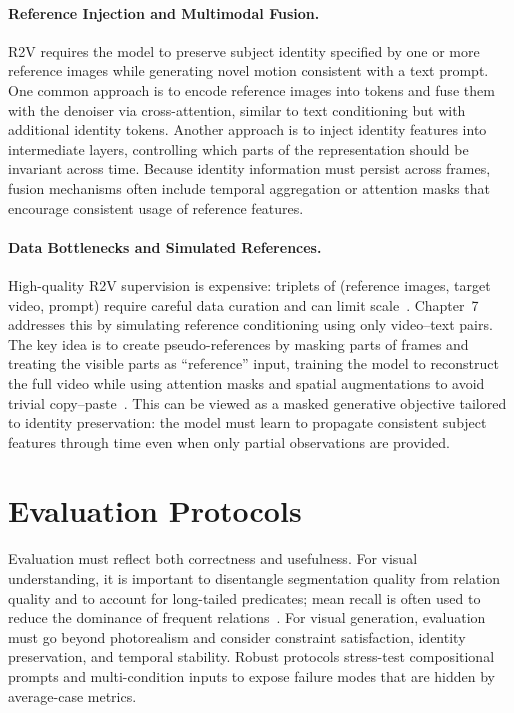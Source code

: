 \paragraph{Reference Injection and Multimodal Fusion.}
R2V requires the model to preserve subject identity specified by one or more reference images while generating novel motion consistent with a text prompt. One common approach is to encode reference images into tokens and fuse them with the denoiser via cross-attention, similar to text conditioning but with additional identity tokens. Another approach is to inject identity features into intermediate layers, controlling which parts of the representation should be invariant across time. Because identity information must persist across frames, fusion mechanisms often include temporal aggregation or attention masks that encourage consistent usage of reference features.

\paragraph{Data Bottlenecks and Simulated References.}
High-quality R2V supervision is expensive: triplets of (reference images, target video, prompt) require careful data curation and can limit scale~\citep{yuan2025opens2v, liu2025phantom}. Chapter~7 addresses this by simulating reference conditioning using only video--text pairs. The key idea is to create pseudo-references by masking parts of frames and treating the visible parts as ``reference'' input, training the model to reconstruct the full video while using attention masks and spatial augmentations to avoid trivial copy--paste~\citep{zhou2025scaling}. This can be viewed as a masked generative objective tailored to identity preservation: the model must learn to propagate consistent subject features through time even when only partial observations are provided.

\section{Evaluation Protocols}
Evaluation must reflect both correctness and usefulness. For visual understanding, it is important to disentangle segmentation quality from relation quality and to account for long-tailed predicates; mean recall is often used to reduce the dominance of frequent relations~\citep{zellers2018neural, yang2022panoptic}. For visual generation, evaluation must go beyond photorealism and consider constraint satisfaction, identity preservation, and temporal stability. Robust protocols stress-test compositional prompts and multi-condition inputs to expose failure modes that are hidden by average-case metrics.

